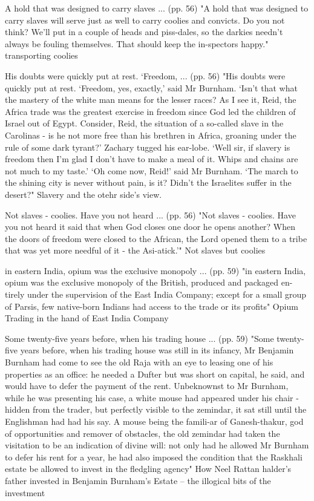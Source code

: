 A hold that was designed to carry slaves ... (pp. 56)
"A hold that was designed to carry slaves will serve just as well to carry coolies and convicts. Do you not think? We’ll put in a couple of heads and piss-dales, so the darkies needn’t always be fouling themselves. That should keep the in-spectors happy."
transporting coolies

His doubts were quickly put at rest. ‘Freedom, ... (pp. 56)
"His doubts were quickly put at rest. ‘Freedom, yes, exactly,’ said Mr Burnham. ‘Isn’t that what the mastery of the white man means for the lesser races? As I see it, Reid, the Africa trade was the greatest exercise in freedom since God led the children of Israel out of Egypt. Consider, Reid, the situation of a so-called slave in the Carolinas - is he not more free than his brethren in Africa, groaning under the rule of some dark tyrant?’ Zachary tugged his ear-lobe. ‘Well sir, if slavery is freedom then I’m glad I don’t have to make a meal of it. Whips and chains are not much to my taste.’ ‘Oh come now, Reid!’ said Mr Burnham. ‘The march to the shining city is never without pain, is it? Didn’t the Israelites suffer in the desert?"
Slavery and the otehr side's view.

Not slaves - coolies. Have you not heard ... (pp. 56)
"Not slaves - coolies. Have you not heard it said that when God closes one door he opens another? When the doors of freedom were closed to the African, the Lord opened them to a tribe that was yet more needful of it - the Asi-atick.’"
Not slaves but coolies

in eastern India, opium was the exclusive monopoly ... (pp. 59)
"in eastern India, opium was the exclusive monopoly of the British, produced and packaged en-tirely under the supervision of the East India Company; except for a small group of Parsis, few native-born Indians had access to the trade or its profits"
Opium Trading in the hand of East India Company

Some twenty-five years before, when his trading house ... (pp. 59)
"Some twenty-five years before, when his trading house was still in its infancy, Mr Benjamin Burnham had come to see the old Raja with an eye to leasing one of his properties as an office: he needed a Dufter but was short on capital, he said, and would have to defer the payment of the rent. Unbeknownst to Mr Burnham, while he was presenting his case, a white mouse had appeared under his chair - hidden from the trader, but perfectly visible to the zemindar, it sat still until the Englishman had had his say. A mouse being the famili-ar of Ganesh-thakur, god of opportunities and remover of obstacles, the old zemindar had taken the visitation to be an indication of divine will: not only had he allowed Mr Burnham to defer his rent for a year, he had also imposed the condition that the Raskhali estate be allowed to invest in the fledgling agency"
How Neel Rattan halder's father invested in Benjamin Burnham's Estate -- the illogical bits of the investment

